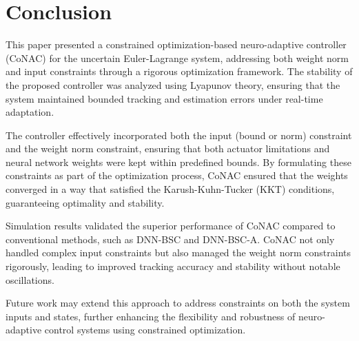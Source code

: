 \documentclass[lettersize,journal]{IEEEtran}
\begin{document}

\section{Conclusion}\label{sec:conclusion}

This paper presented a constrained optimization-based neuro-adaptive controller (CoNAC) for the uncertain Euler-Lagrange system, addressing both weight norm and input constraints through a rigorous optimization framework. The stability of the proposed controller was analyzed using Lyapunov theory, ensuring that the system maintained bounded tracking and estimation errors under real-time adaptation.

The controller effectively incorporated both the input (bound or norm) constraint and the weight norm constraint, ensuring that both actuator limitations and neural network weights were kept within predefined bounds. By formulating these constraints as part of the optimization process, CoNAC ensured that the weights converged in a way that satisfied the Karush-Kuhn-Tucker (KKT) conditions, guaranteeing optimality and stability.

Simulation results validated the superior performance of CoNAC compared to conventional methods, such as DNN-BSC and DNN-BSC-A. CoNAC not only handled complex input constraints but also managed the weight norm constraints rigorously, leading to improved tracking accuracy and stability without notable oscillations.

Future work may extend this approach to address constraints on both the system inputs and states, further enhancing the flexibility and robustness of neuro-adaptive control systems using constrained optimization.



\end{document}
